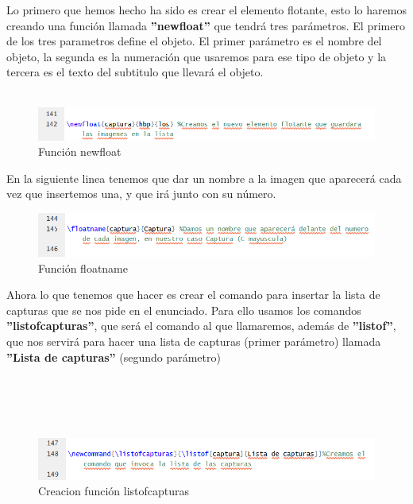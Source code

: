 \documentclass{article}
\begin{document}
Lo primero que hemos hecho ha sido es crear el elemento flotante, esto lo haremos creando una función llamada \textbf{''newfloat''} que tendrá tres parámetros. El primero de los tres parametros define el objeto. El primer parámetro es el nombre del objeto, la segunda es la numeración que usaremos para ese tipo de objeto y la tercera es el texto del subtitulo que llevará el objeto.\\\\


\begin{figure}[h!]
\centering
\includegraphics[scale=1]{CAP1}
\caption{Función newfloat}
\label{fig:cap1}
\end{figure}

En la siguiente linea tenemos que dar un nombre a la imagen que aparecerá cada vez que insertemos una, y que irá junto con su número. \\


\begin{figure}[h!]
\centering
\includegraphics[scale=1]{CAP2}
\caption{Función floatname}
\label{fig:cap1}
\end{figure}

Ahora lo que tenemos que hacer es crear el comando para insertar la lista de capturas que se nos pide en el enunciado. Para ello usamos los comandos \textbf{''listofcapturas''}, que será el comando al que llamaremos, además de \textbf{''listof''}, que nos servirá para hacer una lista de capturas (primer parámetro) llamada \textbf{''Lista de capturas''} (segundo parámetro) \\\\\\\\\

\begin{figure}[h!]
\centering
\includegraphics[scale=1]{CAP3}
\caption{Creacion función listofcapturas}
\label{fig:cap1}
\end{figure}
\end{document}
